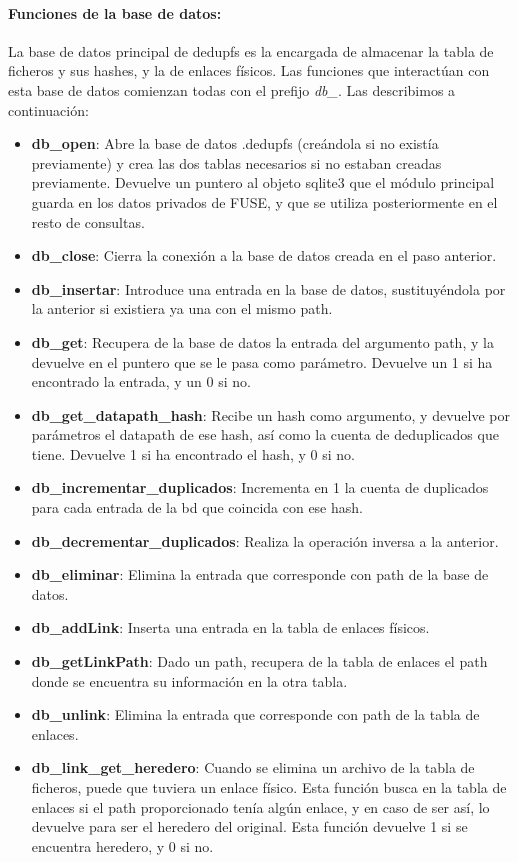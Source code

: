 \documentclass[12pt,a4paper]{article}
\begin{document}
\paragraph{Funciones de la base de datos:} La base de datos principal de dedupfs es la encargada de almacenar la tabla de ficheros y sus hashes, y la de enlaces físicos. Las funciones que interactúan con esta base de datos comienzan todas con el prefijo \emph{db\_}. Las describimos a continuación:
\begin{itemize}
 \item \textbf{db\_open}: Abre la base de datos .dedupfs (creándola si no existía previamente) y crea las dos tablas necesarios si no estaban creadas previamente. Devuelve un puntero al objeto sqlite3 que el módulo principal guarda en los datos privados de FUSE, y que se utiliza posteriormente en el resto de consultas.
  \item \textbf{db\_close}: Cierra la conexión a la base de datos creada en el paso anterior.
  \item \textbf{db\_insertar}: Introduce una entrada en la base de datos, sustituyéndola por la anterior si existiera ya una con el mismo path.
  \item \textbf{db\_get}: Recupera de la base de datos la entrada del argumento path, y la devuelve en el puntero que se le pasa como parámetro.
  Devuelve un 1 si ha encontrado la entrada, y un 0 si no.
  \item \textbf{db\_get\_datapath\_hash}: Recibe un hash como argumento, y devuelve por parámetros el datapath de ese hash, así como la cuenta de deduplicados que tiene. Devuelve 1 si ha encontrado el hash, y 0 si no.
  \item \textbf{db\_incrementar\_duplicados}: Incrementa en 1 la cuenta de duplicados para cada entrada de la bd que coincida con ese hash.
  \item \textbf{db\_decrementar\_duplicados}: Realiza la operación inversa a la anterior.
  \item \textbf{db\_eliminar}: Elimina la entrada que corresponde con path de la base de datos.
  \item \textbf{db\_addLink}: Inserta una entrada en la tabla de enlaces físicos.
  \item \textbf{db\_getLinkPath}: Dado un path, recupera de la tabla de enlaces el path donde se encuentra su información en la otra tabla.
  \item \textbf{db\_unlink}: Elimina la entrada que corresponde con path de la tabla de enlaces.
  \item \textbf{db\_link\_get\_heredero}: Cuando se elimina un archivo de la tabla de ficheros, puede que tuviera un enlace físico. Esta función busca en la tabla de enlaces si el path proporcionado tenía algún enlace, y en caso de ser así, lo devuelve para ser el heredero del original. Esta función devuelve 1 si se encuentra heredero, y 0 si no.

\end{itemize}
\end{document}

